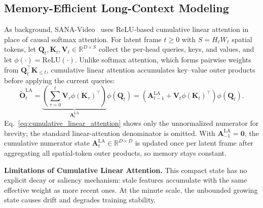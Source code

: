 \documentclass{llmxive}
\begin{document}
\subsection{Memory-Efficient Long-Context Modeling}
\label{sec:long_context_modeling}

As background, SANA-Video~\citep{chen2025sana} uses ReLU-based cumulative linear attention in place of causal softmax attention.
For latent frame $t\ge0$ with $S=H_\ell W_\ell$ spatial tokens, let $\mathbf{Q}_t,\mathbf{K}_t,\mathbf{V}_t\in\mathbb{R}^{D\times S}$ collect the per-head queries, keys, and values, and let $\phi(\cdot)=\mathrm{ReLU}(\cdot)$.
Unlike softmax attention, which forms pairwise weights from $\mathbf{Q}_t^\top\mathbf{K}_{\le t}$, cumulative linear attention accumulates key--value outer products before applying the current queries:
{\small
\begin{equation}
\label{eq:cumulative_linear_attention}
\widetilde{\mathbf{O}}^{\mathrm{LA}}_t
=
\underbrace{\left(\sum_{\tau=0}^{t}\mathbf{V}_\tau\phi(\mathbf{K}_\tau)^\top\right)}_{\mathbf{A}^{\mathrm{LA}}_t}
\phi(\mathbf{Q}_t)
=
\left(\mathbf{A}^{\mathrm{LA}}_{t-1}+\mathbf{V}_t\phi(\mathbf{K}_t)^\top\right)\phi(\mathbf{Q}_t).
\end{equation}
}
Eq.~\ref{eq:cumulative_linear_attention} shows only the unnormalized numerator for brevity; the standard linear-attention denominator is omitted.
With $\mathbf{A}^{\mathrm{LA}}_{-1}=\mathbf{0}$, the cumulative numerator state $\mathbf{A}^{\mathrm{LA}}_t\in\mathbb{R}^{D\times D}$ is updated once per latent frame after aggregating all spatial-token outer products, so memory stays constant.

\noindent \textbf{Limitations of Cumulative Linear Attention.}
This compact state has no explicit decay or saliency mechanism: stale features accumulate with the same effective weight as more recent ones. At the minute scale, the unbounded growing state causes drift and degrades training stability.
\end{document}
